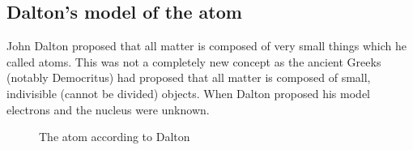 \subsection*{Dalton's model of the atom}
\begin{minipage}{.5\textwidth}
John Dalton proposed that all matter is composed of very small things which he called atoms. This was not a completely new concept as the ancient Greeks (notably Democritus) had proposed that all matter is composed of small, indivisible (cannot be divided) objects. When Dalton proposed his model electrons and the nucleus were unknown.  
\end{minipage}
\begin{minipage}{.5\textwidth}
   \setcounter{subfigure}{0}
	\begin{figure}[H] %
    \begin{center}
\begin{minipage}{.8\textwidth}
\caption{The atom according to Dalton}
\end{minipage}
\label{fig:atom:dalton}
\end{center}
 \end{figure}
\end{minipage}

      \label{m38756*uid1}
